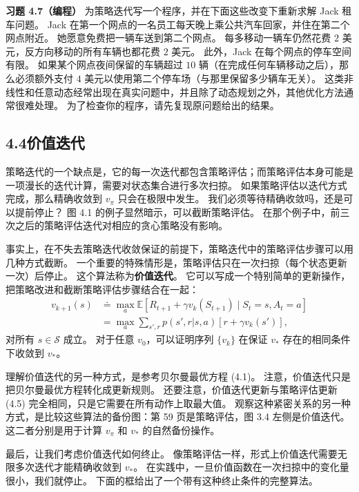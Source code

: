 \documentclass[UTF8,12pt,a4paper,fontset=fandol]{ctexart}
\begin{document}
\noindent\textbf{习题 4.7（编程）}
为策略迭代写一个程序，并在下面这些改变下重新求解 Jack 租车问题。
Jack 在第一个网点的一名员工每天晚上乘公共汽车回家，并住在第二个网点附近。
她愿意免费把一辆车送到第二个网点。
每多移动一辆车仍然花费 $2$ 美元，反方向移动的所有车辆也都花费 $2$ 美元。
此外，Jack 在每个网点的停车空间有限。
如果某个网点夜间保留的车辆超过 $10$ 辆（在完成任何车辆移动之后），那么必须额外支付 $4$ 美元以使用第二个停车场（与那里保留多少辆车无关）。
这类非线性和任意动态经常出现在真实问题中，并且除了动态规划之外，其他优化方法通常很难处理。
为了检查你的程序，请先复现原问题给出的结果。

\subsection*{4.4\quad 价值迭代}

策略迭代的一个缺点是，它的每一次迭代都包含策略评估；而策略评估本身可能是一项漫长的迭代计算，需要对状态集合进行多次扫掠。
如果策略评估以迭代方式完成，那么精确收敛到 $v_\pi$ 只会在极限中发生。
我们必须等待精确收敛吗，还是可以提前停止？
图 4.1 的例子显然暗示，可以截断策略评估。
在那个例子中，前三次之后的策略评估迭代对相应的贪心策略没有影响。

事实上，在不失去策略迭代收敛保证的前提下，策略迭代中的策略评估步骤可以用几种方式截断。
一个重要的特殊情形是，策略评估只在一次扫掠（每个状态更新一次）后停止。
这个算法称为\textbf{价值迭代}。
它可以写成一个特别简单的更新操作，把策略改进和截断策略评估步骤结合在一起：
\begin{equation}
\begin{aligned}
v_{k+1}(s)
&\doteq \max_a \mathbb{E}\!\left[R_{t+1}+\gamma v_k(S_{t+1}) \mid S_t=s,A_t=a\right] \\
&= \max_a \sum_{s',r}p(s',r|s,a)\left[r+\gamma v_k(s')\right],
\end{aligned}
\tag{4.10}
\end{equation}
对所有 $s\in\mathcal{S}$ 成立。
对于任意 $v_0$，可以证明序列 $\{v_k\}$ 在保证 $v_*$ 存在的相同条件下收敛到 $v_*$。

理解价值迭代的另一种方式，是参考贝尔曼最优方程 (4.1)。
注意，价值迭代只是把贝尔曼最优方程转化成更新规则。
还要注意，价值迭代更新与策略评估更新 (4.5) 完全相同，只是它需要在所有动作上取最大值。
观察这种紧密关系的另一种方式，是比较这些算法的备份图：第 59 页是策略评估，图 3.4 左侧是价值迭代。
这二者分别是用于计算 $v_\pi$ 和 $v_*$ 的自然备份操作。

最后，让我们考虑价值迭代如何终止。
像策略评估一样，形式上价值迭代需要无限多次迭代才能精确收敛到 $v_*$。
在实践中，一旦价值函数在一次扫掠中的变化量很小，我们就停止。
下面的框给出了一个带有这种终止条件的完整算法。
\end{document}
